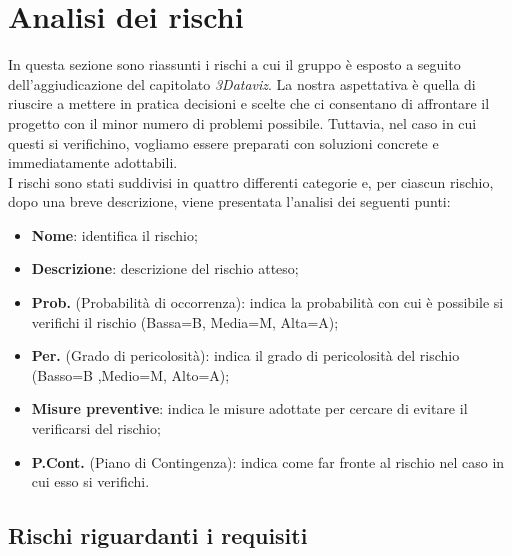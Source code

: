 \section{Analisi dei rischi}
In questa sezione sono riassunti i rischi a cui il gruppo è esposto a seguito dell'aggiudicazione del capitolato \textit{3Dataviz}.
La nostra aspettativa è quella di riuscire a mettere in pratica decisioni e scelte che ci consentano di affrontare il progetto con il minor numero di problemi possibile.
Tuttavia, nel caso in cui questi si verifichino, vogliamo essere preparati con soluzioni concrete e immediatamente adottabili.
\\I rischi sono stati suddivisi in quattro differenti categorie e, per ciascun rischio, dopo una breve descrizione, viene presentata l'analisi dei seguenti punti:
\begin{itemize}
    \item \textbf{Nome}: identifica il rischio;
    \item \textbf{Descrizione}: descrizione del rischio atteso;
    \item \textbf{Prob.} (Probabilità di occorrenza): indica la probabilità con cui è possibile si verifichi il rischio (Bassa=B, Media=M, Alta=A);
    \item \textbf{Per.} (Grado di pericolosità): indica il grado di pericolosità del rischio (Basso=B ,Medio=M, Alto=A);
    \item \textbf{Misure preventive}: indica le misure adottate per cercare di evitare il verificarsi del rischio;
    \item \textbf{P.Cont.} (Piano di Contingenza): indica come far fronte al rischio nel caso in cui esso si verifichi. 
\end{itemize}


\subsection{Rischi riguardanti i requisiti}
\pagebreak
